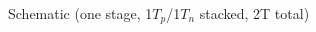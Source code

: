 \begin{center}
    Schematic (one stage, 1$T_{p}$/1$T_{n}$ stacked, 2T total)
    \begin{figure}[h] %
        \begin{center}
            \begin{circuitdiagram}{12}{15}
            \end{circuitdiagram}
        \end{center}
    \end{figure}
\end{center}
